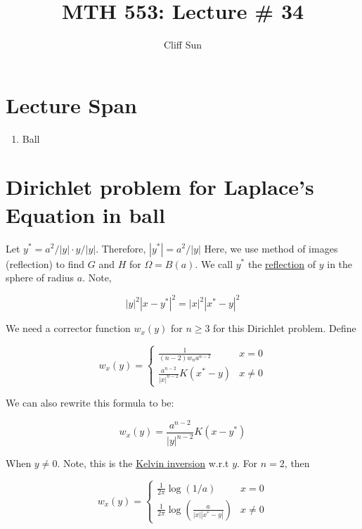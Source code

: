 \documentclass{article}
\title{MTH 553: Lecture \# 34}
\author{Cliff Sun}
\newtheorem{one minute paper}[theorem]{One Minute Paper}
\begin{document}
\maketitle

\section*{Lecture Span}
\begin{enumerate}
    \item Ball
\end{enumerate}

\section*{Dirichlet problem for Laplace's Equation in ball}

Let $y^* = a^2/|y| \cdot y/|y|$. Therefore, $|y^*| = a^2/|y|$ Here, we use method of images (reflection) to find $G$ and $H$ for $\Omega = B(a)$. 
We call $y^*$ the \underline{reflection} of $y$ in the sphere of radius $a$. Note, 

\begin{equation}
    |y|^2|x-y^*|^2 = |x|^2|x^* - y|^2
\end{equation}

We need a corrector function $w_x(y)$ for $n \geq 3$ for this Dirichlet problem. Define 

\begin{equation}
    w_x(y) = \begin{cases}
        \frac{1}{(n-2)w_na^{n-2}} & x = 0\\
        \frac{a^{n-2}}{|x|^{n-2}} K(x^* - y) & x \neq 0
    \end{cases}
\end{equation}

We can also rewrite this formula to be:

\begin{equation}
    w_x(y) = \frac{a^{n-2}}{|y|^{n-2}}K(x-y^*)
\end{equation}

When $y \neq 0$. Note, this is the \underline{Kelvin inversion} w.r.t $y$. For $n=2$, then 

\begin{equation}
    w_x(y) = \begin{cases}
        \frac{1}{2\pi}\log(1/a) & x = 0\\
        \frac{1}{2\pi}\log\left( \frac{a}{|x||x^* - y|} \right) & x \neq 0
    \end{cases}
\end{equation}
\end{document}
